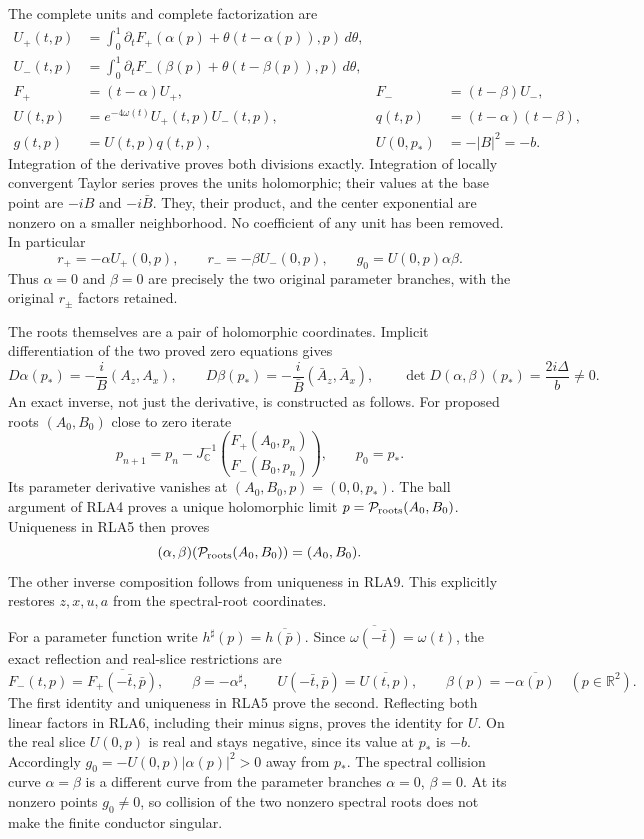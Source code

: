 \documentclass[11pt]{article}
\begin{document}
The complete units and complete factorization are
\[
\begin{aligned}
 U_+(t,p)&=\int_0^1\partial_tF_+
       (\alpha(p)+\theta(t-\alpha(p)),p)\,d\theta,\\
 U_-(t,p)&=\int_0^1\partial_tF_-
       (\beta(p)+\theta(t-\beta(p)),p)\,d\theta,\\
 F_+&=(t-\alpha)U_+,&F_-&=(t-\beta)U_-,\\
 U(t,p)&=e^{-4\omega(t)}U_+(t,p)U_-(t,p),&
 q(t,p)&=(t-\alpha)(t-\beta),\\
 g(t,p)&=U(t,p)q(t,p),&U(0,p_*)&=-|B|^2=-b.
\end{aligned}\tag{RLA6}
\]
Integration of the derivative proves both divisions exactly.
Integration of locally convergent Taylor series proves the units
holomorphic; their values at the base point are $-iB$ and
$-i\bar B$.  They, their product, and the center exponential are
nonzero on a smaller neighborhood.  No coefficient of any unit
has been removed.  In particular
\[
 r_+=-\alpha U_+(0,p),\qquad r_-=-\beta U_-(0,p),\qquad
 g_0=U(0,p)\alpha\beta.
 \tag{RLA7}
\]
Thus $\alpha=0$ and $\beta=0$ are precisely the two original
parameter branches, with the original $r_\pm$ factors retained.

The roots themselves are a pair of holomorphic coordinates.  Implicit
differentiation of the two proved zero equations gives
\[
 D\alpha(p_*)=-\frac{i}{B}(A_z,A_x),\qquad
 D\beta(p_*)=-\frac{i}{\bar B}(\bar A_z,\bar A_x),\qquad
 \det D(\alpha,\beta)(p_*)=\frac{2i\Delta}{b}\ne0.
 \tag{RLA8}
\]
An exact inverse, not just the derivative, is constructed as follows.
For proposed roots $(A_0,B_0)$ close to zero iterate
\[
 p_{n+1}=p_n-J_{\mathbb C}^{-1}
       \binom{F_+(A_0,p_n)}{F_-(B_0,p_n)},\qquad p_0=p_*.
 \tag{RLA9}
\]
Its parameter derivative vanishes at $(A_0,B_0,p)=(0,0,p_*)$.
The ball argument of RLA4 proves a unique holomorphic limit
$p=\mathcal P_{\rm roots}(A_0,B_0)$.
Uniqueness in RLA5 then proves
\[ (\alpha,\beta)(\mathcal P_{\rm roots}(A_0,B_0))=(A_0,B_0). \]
The other inverse composition follows from uniqueness in RLA9.
This explicitly restores $z,x,u,a$ from the spectral-root coordinates.

For a parameter function write $h^\sharp(p)=\overline{h(\bar p)}$.
Since $\overline{\omega(-\bar t)}=\omega(t)$, the exact reflection
and real-slice restrictions are
\[
 F_-(t,p)=\overline{F_+(-\bar t,\bar p)},\qquad
 \beta=-\alpha^\sharp,\qquad
 U(-\bar t,\bar p)=\overline{U(t,p)},\qquad
 \beta(p)=-\overline{\alpha(p)}\quad(p\in\mathbb R^2).
 \tag{RLA10}
\]
The first identity and uniqueness in RLA5 prove the second.
Reflecting both linear factors in RLA6, including their minus signs,
proves the identity for $U$.  On the real slice $U(0,p)$ is real
and stays negative, since its value at $p_*$ is $-b$.
Accordingly $g_0=-U(0,p)|\alpha(p)|^2>0$ away from $p_*$.
The spectral collision curve $\alpha=\beta$ is a different curve
from the parameter branches $\alpha=0$, $\beta=0$.
At its nonzero points $g_0\ne0$, so collision of the two nonzero
spectral roots does not make the finite conductor singular.
\end{document}
